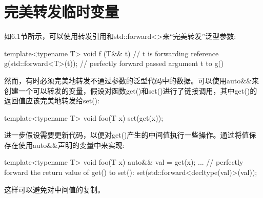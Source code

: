 \section{完美转发临时变量}
如6.1节所示，可以使用转发引用和std::forward<>来“完美转发”泛型参数:

\begin{cpp}
template<typename T>
void f (T&& t) // t is forwarding reference
{
	g(std::forward<T>(t)); // perfectly forward passed argument t to g()
}
\end{cpp}

然而，有时必须完美地转发不通过参数的泛型代码中的数据。可以使用auto\&\&来创建一个可以转发的变量，假设对函数get()和set()进行了链接调用，其中get()的返回值应该完美地转发给set():

\begin{cpp}
template<typename T>
void foo(T x)
{
	set(get(x));
}
\end{cpp}

进一步假设需要更新代码，以便对get()产生的中间值执行一些操作。通过将值保存在使用auto\&\&声明的变量中来实现:

\begin{cpp}
template<typename T>
void foo(T x)
{
	auto&& val = get(x);
	...
	// perfectly forward the return value of get() to set():
	set(std::forward<decltype(val)>(val));
}
\end{cpp}

这样可以避免对中间值的复制。








































